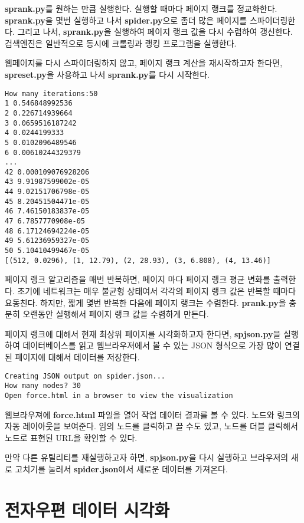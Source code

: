 {\bf sprank.py}를 원하는 만큼 실행한다. 
실행할 때마다 페이지 랭크를 정교화한다.
{\bf sprank.py}을 몇번 실행하고 나서 {\bf spider.py}으로 좀더 많은 페이지를 스파이더링한다.
그리고 나서, {\bf sprank.py}을 실행하여 페이지 랭크 값을 다시 수렴하여 갱신한다. 
검색엔진은 일반적으로 동시에 크롤링과 랭킹 프로그램을 실행한다.

웹페이지를 다시 스파이더링하지 않고, 페이지 랭크 계산을 재시작하고자 한다면,
{\bf spreset.py}을 사용하고 나서 {\bf sprank.py}를 다시 시작한다.

\beforeverb
\begin{verbatim}
How many iterations:50
1 0.546848992536
2 0.226714939664
3 0.0659516187242
4 0.0244199333
5 0.0102096489546
6 0.00610244329379
...
42 0.000109076928206
43 9.91987599002e-05
44 9.02151706798e-05
45 8.20451504471e-05
46 7.46150183837e-05
47 6.7857770908e-05
48 6.17124694224e-05
49 5.61236959327e-05
50 5.10410499467e-05
[(512, 0.0296), (1, 12.79), (2, 28.93), (3, 6.808), (4, 13.46)]
\end{verbatim}
\afterverb
%

페이지 랭크 알고리즘을 매번 반복하면, 페이지 마다 페이지 랭크 평균 변화를 출력한다.
초기에 네트워크는 매우 불균형 상태여서 각각의 페이지 랭크 값은 반복할 때마다 요동친다.
하지만, 짧게 몇번 반복한 다음에 페이지 랭크는 수렴한다.
{\bf prank.py}을 충분히 오랜동안 실행해서 페이지 랭크 값을 수렴하게 만든다.

페이지 랭크에 대해서 현재 최상위 페이지를 시각화하고자 한다면, 
{\bf spjson.py}을 실행하여 데이터베이스를 읽고 웹브라우져에서 볼 수 있는 JSON 형식으로 가장 많이 연결된 페이지에 대해서 데이터를 저장한다.

\beforeverb
\begin{verbatim}
Creating JSON output on spider.json...
How many nodes? 30
Open force.html in a browser to view the visualization
\end{verbatim}
\afterverb
%

웹브라우져에 {\bf force.html} 파일을 열어 작업 데이터 결과를 볼 수 있다.
노드와 링크의 자동 레이아웃을 보여준다. 
임의 노드를 클릭하고 끌 수도 있고, 노드를 더블 클릭해서 노드로 표현된 URL을 확인할 수 있다.

만약 다른 유틸리티를 재실행하고자 하면, {\bf spjson.py}을 다시 실행하고 브라우져의 새로 고치기를 눌러서
{\bf spider.json}에서 새로운 데이터를 가져온다.


\section{전자우편 데이터 시각화}

